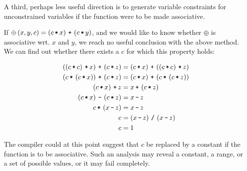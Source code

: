 A third, perhaps less useful direction is to generate variable constraints for
unconstrained variables if the function were to be made associative.

If $\oplus\p{x,y,c} = \p{c\lt x} \lp \p{c \lt y}$, and we would like to know
whether $\oplus$ is associative wrt. $x$ and $y$, we reach no useful conclusion
with the above method. We can find out whether there exists a $c$ for which
this property holds:

\begin{align*}
\p{\p{c \lt c} \lt x} \lp \p{c \lt z} &= \p{c \lt x} \lp \p{\p{c \lt c} \lt z} \\
\p{c \lt \p{c \lt x}} \lp \p{c \lt z} &= \p{c \lt x} \lp \p{c \lt \p{c \lt z}} \\
\p{c \lt x} \lp z &= x \lp \p{c \lt z} \\
\p{c \lt x} \lm \p{c \lt z} &= x \lm z \\
c \lt \p{x \lm z} &= x \lm z \\
c &= \p{x \lm z} \ld  \p{x \lm z} \\
c &= 1
\end{align*}

The compiler could at this point suggest that $c$ be replaced by a constant if
the function is to be associative. Such an analysis may reveal a constant, a
range, or a set of possible values, or it may fail completely.

